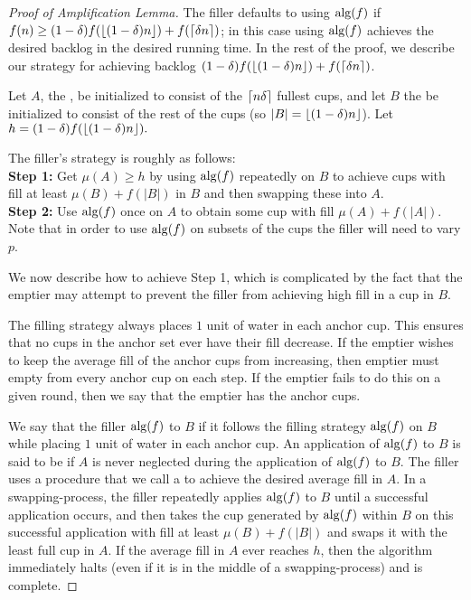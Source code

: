 \begin{proof}[Proof of Amplification Lemma]
  The filler defaults to using $\operatorname{\text{\textup{alg}}}(f)$ if $f(n) \ge
(1-\delta)f(\left\lfloor (1-\delta)n \right\rfloor) + f(\left\lceil \delta n \right\rceil)$; in this
case using $\operatorname{\text{\textup{alg}}}(f)$
achieves the desired backlog in the desired running time. In the
rest of the proof, we describe our strategy for achieving backlog
$(1-\delta)f(\left\lfloor (1-\delta)n \right\rfloor) + f(\left\lceil \delta n \right\rceil)$. 

  Let $A$, the , be initialized to consist of
  the $\left\lceil n\delta \right\rceil$ fullest cups, and let $B$ the
   be initialized to consist of the rest of
  the cups (so $|B| = \left\lfloor (1-\delta)n \right\rfloor$). Let $h =
  (1-\delta)f(\left\lfloor (1-\delta)n \right\rfloor).$

  The filler's strategy is roughly as follows: \\
  \textbf{Step 1:} Get $\mu(A) \ge h$ by using $\operatorname{\text{\textup{alg}}}(f)$
  repeatedly on $B$ to achieve cups with fill at least $\mu(B) +
  f(|B|)$ in $B$ and then swapping these into $A$.\\
  \textbf{Step 2:} Use $\operatorname{\text{\textup{alg}}}(f)$ once on $A$ to obtain some cup
  with fill $\mu(A)+f(|A|)$.\\
  Note that in order to use $\operatorname{\text{\textup{alg}}}(f)$ on subsets of the cups the
  filler will need to vary $p$.

  We now describe how to achieve Step 1, which is
  complicated by the fact that the emptier may attempt to
  prevent the filler from achieving high fill in a cup
  in $B$.

  The filling strategy always places $1$ unit of water in each
  anchor cup. This ensures that no cups in the anchor set ever
  have their fill decrease. If the emptier wishes to keep the
  average fill of the anchor cups from increasing, then emptier
  must empty from every anchor cup on each step. If the emptier
  fails to do this on a given round, then we say that the emptier
  has  the anchor cups. 

  We say that the filler  $\operatorname{\text{\textup{alg}}}(f)$ to $B$ if it
  follows the filling strategy $\operatorname{\text{\textup{alg}}}(f)$ on $B$ while placing $1$
  unit of water in each anchor cup. An application of $\operatorname{\text{\textup{alg}}}(f)$ to
  $B$ is said to be  if $A$ is never neglected
  during the application of $\operatorname{\text{\textup{alg}}}(f)$ to $B$. The filler uses a
  procedure that we call a  to achieve the
  desired average fill in $A$. In a swapping-process, the filler
  repeatedly applies $\operatorname{\text{\textup{alg}}}(f)$ to $B$ until a successful
  application occurs, and then takes the cup generated by
  $\operatorname{\text{\textup{alg}}}(f)$ within $B$ on this successful application with fill at
  least $\mu(B) + f(|B|)$ and swaps it with the least full cup in
  $A$. If the average fill in $A$ ever reaches $h$, then the
  algorithm immediately halts (even if it is in the middle of a
  swapping-process) and is complete.
  

\end{proof}
